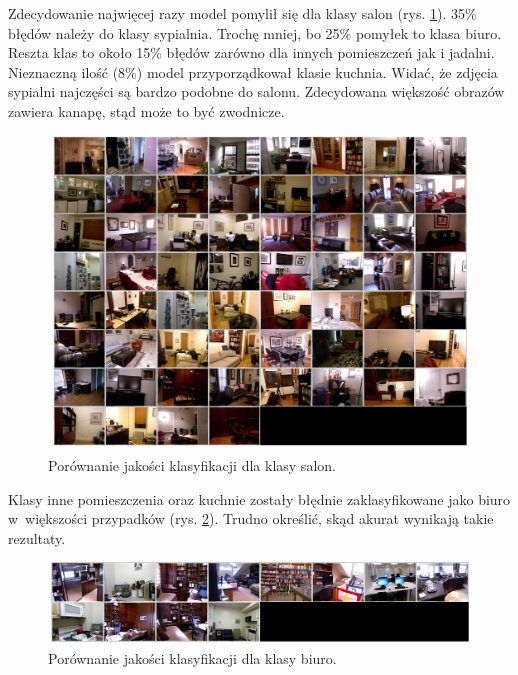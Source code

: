 Zdecydowanie najwięcej razy model pomylił się dla klasy salon (rys. \ref{fig:living_room-false-pred}). 35\% błędów należy do klasy sypialnia. Trochę mniej, bo 25\% pomyłek to klasa biuro. Reszta klas to około 15\% błędów zarówno dla innych pomieszczeń jak i jadalni. Nieznaczną ilość (8\%) model przyporządkował klasie kuchnia. Widać, że zdjęcia sypialni najczęści są bardzo podobne do salonu. Zdecydowana większość obrazów zawiera kanapę, stąd może to być zwodnicze.

\begin{figure}[ht!]
    \centering
    \includegraphics[width=\textwidth]{img/preds_analysis/classification/living_room-2.png}
    \caption{Porównanie jakości klasyfikacji dla klasy salon.}
    \label{fig:living_room-false-pred}
\end{figure}

Klasy inne pomieszczenia oraz kuchnie zostały błędnie zaklasyfikowane jako biuro w~większości przypadków (rys. \ref{fig:office-false-pred}). Trudno określić, skąd akurat wynikają takie rezultaty.

\begin{figure}[ht!]
    \centering
    \includegraphics[width=\textwidth]{img/preds_analysis/classification/office-2.png}
    \caption{Porównanie jakości klasyfikacji dla klasy biuro.}
    \label{fig:office-false-pred}
\end{figure}

